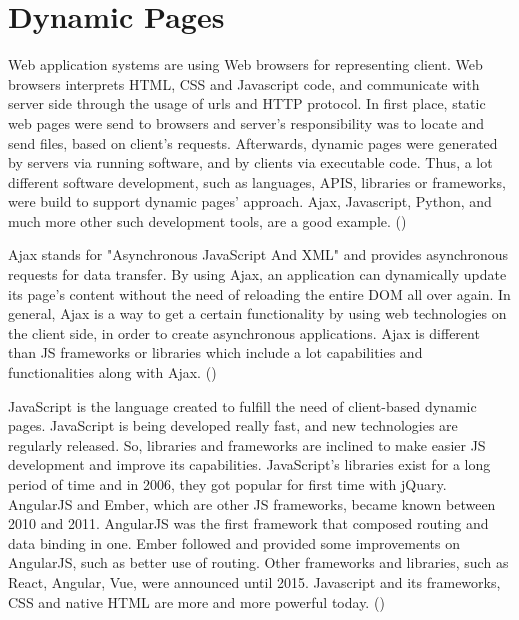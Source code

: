 \section{Dynamic Pages}

Web application systems are using Web browsers for representing client. Web browsers interprets HTML, CSS and Javascript code, and communicate with server side through the usage of urls and HTTP protocol. In first place, static web pages were send to browsers and server's responsibility was to locate and send files, based on client's requests. Afterwards, dynamic pages were generated by servers via running software, and by clients via executable code. Thus, a lot different software development, such as languages, APIS, libraries or frameworks, were build to support dynamic pages' approach. Ajax, Javascript, Python, and much more other such development tools, are a good example. (\cite{Reference4}) \par

Ajax stands for "Asynchronous JavaScript And XML" and provides asynchronous requests for data transfer. By using Ajax, an application can dynamically update its page's content without the need of reloading the entire DOM all over again. In general, Ajax is a way to get a certain functionality by using web technologies on the client side, in order to create asynchronous applications. Ajax is different than JS frameworks or libraries which include a lot capabilities and functionalities along with Ajax. (\cite{Reference6}) \par

JavaScript is the language created to fulfill the need of client-based dynamic pages. JavaScript is being developed really fast, and new technologies are regularly released. So, libraries and frameworks are inclined to make easier JS development and improve its capabilities. JavaScript's libraries exist for a long period of time and in 2006, they got popular for first time with jQuary. AngularJS and Ember, which are other JS frameworks, became known between 2010 and 2011. AngularJS was the first framework that composed routing and data binding in one. Ember followed and provided some improvements on AngularJS, such as better use of routing. Other frameworks and libraries, such as React, Angular, Vue, were announced until 2015. Javascript and its frameworks, CSS and native HTML are more and more powerful today. (\cite{Reference6}) \par

